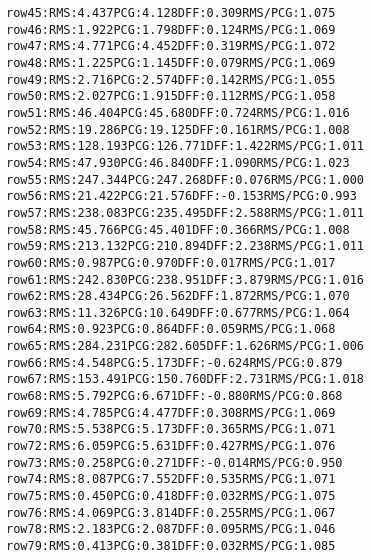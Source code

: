 \begin{alltt}
row  45:  RMS:   4.437    PCG:   4.128    DFF:   0.309    RMS/PCG:   1.075    
row  46:  RMS:   1.922    PCG:   1.798    DFF:   0.124    RMS/PCG:   1.069    
row  47:  RMS:   4.771    PCG:   4.452    DFF:   0.319    RMS/PCG:   1.072    
row  48:  RMS:   1.225    PCG:   1.145    DFF:   0.079    RMS/PCG:   1.069    
row  49:  RMS:   2.716    PCG:   2.574    DFF:   0.142    RMS/PCG:   1.055    
row  50:  RMS:   2.027    PCG:   1.915    DFF:   0.112    RMS/PCG:   1.058    
row  51:  RMS:  46.404    PCG:  45.680    DFF:   0.724    RMS/PCG:   1.016    
row  52:  RMS:  19.286    PCG:  19.125    DFF:   0.161    RMS/PCG:   1.008    
row  53:  RMS: 128.193    PCG: 126.771    DFF:   1.422    RMS/PCG:   1.011    
row  54:  RMS:  47.930    PCG:  46.840    DFF:   1.090    RMS/PCG:   1.023    
row  55:  RMS: 247.344    PCG: 247.268    DFF:   0.076    RMS/PCG:   1.000    
row  56:  RMS:  21.422    PCG:  21.576    DFF:  -0.153    RMS/PCG:   0.993    
row  57:  RMS: 238.083    PCG: 235.495    DFF:   2.588    RMS/PCG:   1.011    
row  58:  RMS:  45.766    PCG:  45.401    DFF:   0.366    RMS/PCG:   1.008    
row  59:  RMS: 213.132    PCG: 210.894    DFF:   2.238    RMS/PCG:   1.011    
row  60:  RMS:   0.987    PCG:   0.970    DFF:   0.017    RMS/PCG:   1.017    
row  61:  RMS: 242.830    PCG: 238.951    DFF:   3.879    RMS/PCG:   1.016    
row  62:  RMS:  28.434    PCG:  26.562    DFF:   1.872    RMS/PCG:   1.070    
row  63:  RMS:  11.326    PCG:  10.649    DFF:   0.677    RMS/PCG:   1.064    
row  64:  RMS:   0.923    PCG:   0.864    DFF:   0.059    RMS/PCG:   1.068    
row  65:  RMS: 284.231    PCG: 282.605    DFF:   1.626    RMS/PCG:   1.006    
row  66:  RMS:   4.548    PCG:   5.173    DFF:  -0.624    RMS/PCG:   0.879    
row  67:  RMS: 153.491    PCG: 150.760    DFF:   2.731    RMS/PCG:   1.018    
row  68:  RMS:   5.792    PCG:   6.671    DFF:  -0.880    RMS/PCG:   0.868    
row  69:  RMS:   4.785    PCG:   4.477    DFF:   0.308    RMS/PCG:   1.069    
row  70:  RMS:   5.538    PCG:   5.173    DFF:   0.365    RMS/PCG:   1.071    
row  72:  RMS:   6.059    PCG:   5.631    DFF:   0.427    RMS/PCG:   1.076    
row  73:  RMS:   0.258    PCG:   0.271    DFF:  -0.014    RMS/PCG:   0.950    
row  74:  RMS:   8.087    PCG:   7.552    DFF:   0.535    RMS/PCG:   1.071    
row  75:  RMS:   0.450    PCG:   0.418    DFF:   0.032    RMS/PCG:   1.075    
row  76:  RMS:   4.069    PCG:   3.814    DFF:   0.255    RMS/PCG:   1.067    
row  78:  RMS:   2.183    PCG:   2.087    DFF:   0.095    RMS/PCG:   1.046    
row  79:  RMS:   0.413    PCG:   0.381    DFF:   0.032    RMS/PCG:   1.085    

\end{alltt}

